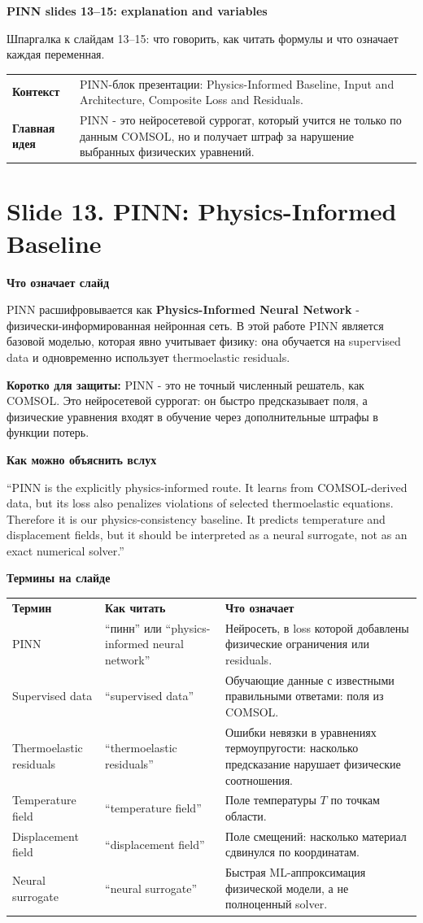 \documentclass[11pt]{article}
\newcommand{\slide}[1]{\section*{\textcolor{TitleBlue}{#1}}}
\newcommand{\minihead}[1]{\vspace{3pt}\textbf{\textcolor{TitleBlue}{#1}}\par}
\newcommand{\callout}[1]{%
  \vspace{3pt}
  \noindent\colorbox{SoftBlue}{%
    \parbox{\dimexpr\linewidth-2\fboxsep\relax}{\raggedright #1}
  }
  \vspace{3pt}
}
\begin{document}
{\LARGE\textbf{\textcolor{TitleBlue}{PINN slides 13--15: explanation and variables}}}

\vspace{3pt}
{\large Шпаргалка к слайдам 13--15: что говорить, как читать формулы и что означает каждая переменная.}

\vspace{6pt}
\begin{tabularx}{\linewidth}{L{28mm}X}
\toprule
\textbf{Контекст} & PINN-блок презентации: Physics-Informed Baseline, Input and Architecture, Composite Loss and Residuals.\\
\textbf{Главная идея} & PINN - это нейросетевой суррогат, который учится не только по данным COMSOL, но и получает штраф за нарушение выбранных физических уравнений.\\
\bottomrule
\end{tabularx}

\slide{Slide 13. PINN: Physics-Informed Baseline}

\minihead{Что означает слайд}
PINN расшифровывается как \textbf{Physics-Informed Neural Network} - физически-информированная нейронная сеть. В этой работе PINN является базовой моделью, которая явно учитывает физику: она обучается на supervised data и одновременно использует thermoelastic residuals.

\callout{\textbf{Коротко для защиты:} PINN - это не точный численный решатель, как COMSOL. Это нейросетевой суррогат: он быстро предсказывает поля, а физические уравнения входят в обучение через дополнительные штрафы в функции потерь.}

\minihead{Как можно объяснить вслух}
``PINN is the explicitly physics-informed route. It learns from COMSOL-derived data, but its loss also penalizes violations of selected thermoelastic equations. Therefore it is our physics-consistency baseline. It predicts temperature and displacement fields, but it should be interpreted as a neural surrogate, not as an exact numerical solver.''

\minihead{Термины на слайде}
\begin{tabularx}{\linewidth}{L{34mm}L{38mm}X}
\textbf{Термин} & \textbf{Как читать} & \textbf{Что означает}\\
PINN & ``пинн'' или ``physics-informed neural network'' & Нейросеть, в loss которой добавлены физические ограничения или residuals.\\
Supervised data & ``supervised data'' & Обучающие данные с известными правильными ответами: поля из COMSOL.\\
Thermoelastic residuals & ``thermoelastic residuals'' & Ошибки невязки в уравнениях термоупругости: насколько предсказание нарушает физические соотношения.\\
Temperature field & ``temperature field'' & Поле температуры $T$ по точкам области.\\
Displacement field & ``displacement field'' & Поле смещений: насколько материал сдвинулся по координатам.\\
Neural surrogate & ``neural surrogate'' & Быстрая ML-аппроксимация физической модели, а не полноценный solver.\\
\end{tabularx}
\end{document}
